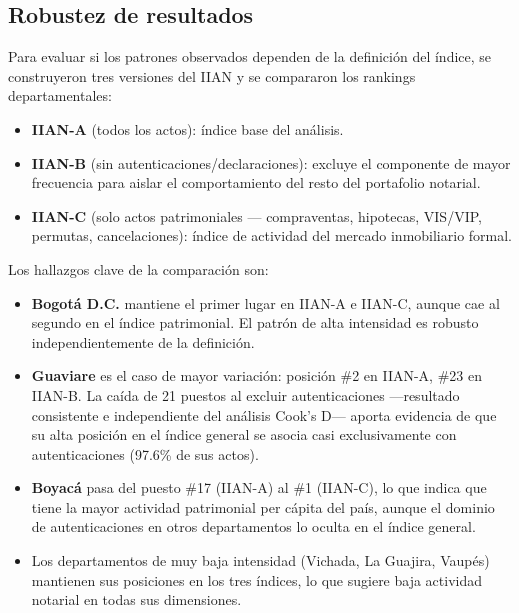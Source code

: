 \documentclass{article}
\begin{document}
\subsection{Robustez de resultados}
\label{subsec:robustez}

Para evaluar si los patrones observados dependen de la definición del
índice, se construyeron tres versiones del IIAN y se compararon los
rankings departamentales:

\begin{itemize}
    \item \textbf{IIAN-A} (todos los actos): índice base del análisis.
    \item \textbf{IIAN-B} (sin autenticaciones/declaraciones): excluye
    el componente de mayor frecuencia para aislar el comportamiento
    del resto del portafolio notarial.
    \item \textbf{IIAN-C} (solo actos patrimoniales — compraventas,
    hipotecas, VIS/VIP, permutas, cancelaciones): índice de actividad
    del mercado inmobiliario formal.
\end{itemize}

Los hallazgos clave de la comparación son:

\begin{itemize}
    \item \textbf{Bogotá D.C.} mantiene el primer lugar en IIAN-A e
    IIAN-C, aunque cae al segundo en el índice patrimonial. El patrón
    de alta intensidad es robusto independientemente de la definición.
    \item \textbf{Guaviare} es el caso de mayor variación:
    posición \#2 en IIAN-A, \#23 en IIAN-B. La caída de 21 puestos
    al excluir autenticaciones ---resultado consistente e independiente
    del análisis Cook's D--- aporta evidencia de que su alta posición
    en el índice general se asocia casi exclusivamente con
    autenticaciones (97.6\% de sus actos).
    \item \textbf{Boyacá} pasa del puesto \#17 (IIAN-A) al \#1
    (IIAN-C), lo que indica que tiene la mayor actividad patrimonial
    per cápita del país, aunque el dominio de autenticaciones en otros
    departamentos lo oculta en el índice general.
    \item Los departamentos de muy baja intensidad (Vichada, La
    Guajira, Vaupés) mantienen sus posiciones en los tres índices,
    lo que sugiere baja actividad notarial en todas sus dimensiones.
\end{itemize}
\end{document}
